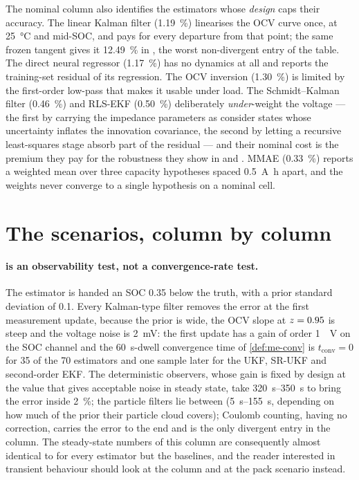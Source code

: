 The nominal column also identifies the estimators whose \emph{design} caps their accuracy.
The linear Kalman filter (\SI{1.19}{\percent}) linearises the OCV curve once, at \SI{25}{\celsius}
and mid-SOC, and pays for every departure from that point; the same frozen tangent gives it
\SI{12.49}{\percent} in , the worst non-divergent entry of the table. The direct
neural regressor (\SI{1.17}{\percent}) has no dynamics at all and reports the training-set
residual of its regression. The OCV inversion (\SI{1.30}{\percent}) is limited by the
first-order low-pass that makes it usable under load. The Schmidt--Kalman filter
(\SI{0.46}{\percent}) and RLS-EKF (\SI{0.50}{\percent}) deliberately \emph{under}-weight the
voltage --- the first by carrying the impedance parameters as consider states whose uncertainty
inflates the innovation covariance, the second by letting a recursive least-squares stage
absorb part of the residual --- and their nominal cost is the premium they pay for the
robustness they show in  and . MMAE
(\SI{0.33}{\percent}) reports a weighted mean over three capacity hypotheses spaced
\SI{0.5}{\ampere\hour} apart, and the weights never converge to a single hypothesis on a
nominal cell.

\section{The scenarios, column by column}

\paragraph{ is an observability test, not a convergence-rate test.}
The estimator is handed an SOC \num{0.35} below the truth, with a prior standard deviation of
\num{0.1}. Every Kalman-type filter removes the error at the first measurement update, because
the prior is wide, the OCV slope at $z = 0.95$ is steep and the voltage noise is
\SI{2}{\milli\volt}: the first update has a gain of order \SI{1}{\per\volt} on the SOC channel
and the \SI{60}{\second}-dwell convergence time of \cref{def:me-conv} is $t_{\text{conv}} = 0$
for 35 of the 70 estimators and one sample later for the UKF, SR-UKF and second-order
EKF. The deterministic observers, whose gain is fixed by design at the
value that gives acceptable noise in steady state, take \SIrange{320}{350}{\second} to bring the
error inside \SI{2}{\percent}; the particle filters lie between (\SIrange{5}{155}{\second},
depending on how much of the prior their particle cloud covers); Coulomb counting, having no
correction, carries the error to the end and is the only divergent entry in the column. The
steady-state numbers of this column are consequently almost identical to  for
every estimator but the baselines, and the reader interested in transient behaviour should look
at the  column and at the pack  scenario instead.

